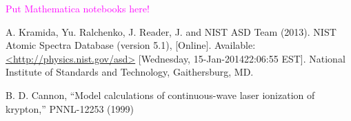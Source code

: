 \documentclass[prb,preprint]{revtex4-1}
\begin{document}
\textcolor{magenta}{Put Mathematica notebooks here!}


\begin{thebibliography}{2}

 A. Kramida, Yu. Ralchenko, J. Reader, J. and NIST ASD Team (2013). NIST Atomic Spectra Database (version 5.1), [Online]. Available: \url{<http://physics.nist.gov/asd>} [Wednesday, 15-Jan-201422:06:55 EST]. National Institute of Standards and Technology, Gaithersburg, MD.

 B. D. Cannon, ``Model calculations of continuous-wave laser ionization of krypton,'' PNNL-12253 (1999)

\end{thebibliography}
\end{document}
